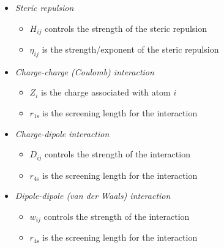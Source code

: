 \begin{itemize}[%
    leftmargin=*,%
    label={}%
]
    \item \textit{Steric repulsion}
    \begin{itemize}[label=$\bullet$]
        \item $H_{ij}$ controls the strength of the steric repulsion
        \item $\eta_{ij}$ is the strength/exponent of the steric repulsion
    \end{itemize}
    \item \textit{Charge-charge (Coulomb) interaction}
    \begin{itemize}[label=$\bullet$]
        \item $Z_i$ is the charge associated with atom $i$
        \item $r_{1\text{s}}$ is the screening length for the interaction
    \end{itemize}
    \item \textit{Charge-dipole interaction}
    \begin{itemize}[label=$\bullet$]
        \item $D_{ij}$ controls the strength of the interaction
        \item $r_{4\text{s}}$ is the screening length for the interaction
    \end{itemize}
    \item \textit{Dipole-dipole (van der Waals) interaction}
    \begin{itemize}[label=$\bullet$]
        \item $w_{ij}$ controls the strength of the interaction
        \item $r_{4\text{s}}$ is the screening length for the interaction
    \end{itemize}
    \vspace{10pt}
\end{itemize}

